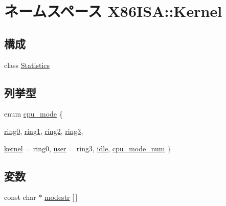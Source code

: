 \hypertarget{namespaceX86ISA_1_1Kernel}{
\section{ネームスペース X86ISA::Kernel}
\label{namespaceX86ISA_1_1Kernel}
}
\subsection*{構成}
\begin{DoxyCompactItemize}
\item 
class \hyperlink{classX86ISA_1_1Kernel_1_1Statistics}{Statistics}
\end{DoxyCompactItemize}
\subsection*{列挙型}
\begin{DoxyCompactItemize}
\item 
enum \hyperlink{namespaceX86ISA_1_1Kernel_aa1fc3805dac6f71f457fbbc263105bf6}{cpu\_\-mode} \{ \par
\hyperlink{namespaceX86ISA_1_1Kernel_aa1fc3805dac6f71f457fbbc263105bf6acdb76ad549505310e4b0b265f760f0d8}{ring0}, 
\hyperlink{namespaceX86ISA_1_1Kernel_aa1fc3805dac6f71f457fbbc263105bf6ac0cdb2eaed5cb9c65eb487df1c9a5cef}{ring1}, 
\hyperlink{namespaceX86ISA_1_1Kernel_aa1fc3805dac6f71f457fbbc263105bf6a94aafb7dcf01d22546c38ed14b1f0786}{ring2}, 
\hyperlink{namespaceX86ISA_1_1Kernel_aa1fc3805dac6f71f457fbbc263105bf6a1249f2b5eb86b7472f7dd8ead54292e7}{ring3}, 
\par
\hyperlink{namespaceX86ISA_1_1Kernel_aa1fc3805dac6f71f457fbbc263105bf6adb0339d028e596254368234e5ab09f9d}{kernel} =  ring0, 
\hyperlink{namespaceX86ISA_1_1Kernel_aa1fc3805dac6f71f457fbbc263105bf6a04981b8c09a50ccfb1d92fc11b81c36a}{user} =  ring3, 
\hyperlink{namespaceX86ISA_1_1Kernel_aa1fc3805dac6f71f457fbbc263105bf6a0e9a37114c0e458d28d52f06ec0f2242}{idle}, 
\hyperlink{namespaceX86ISA_1_1Kernel_aa1fc3805dac6f71f457fbbc263105bf6a4572f7cf10830e04921c8896f22102ba}{cpu\_\-mode\_\-num}
 \}
\end{DoxyCompactItemize}
\subsection*{変数}
\begin{DoxyCompactItemize}
\item 
const char $\ast$ \hyperlink{namespaceX86ISA_1_1Kernel_aaab5092bc6d1c40a90ff4c7450649ace}{modestr} \mbox{[}$\,$\mbox{]}
\end{DoxyCompactItemize}


